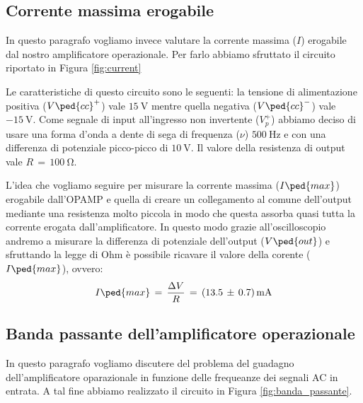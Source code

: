 \subsection*{Corrente massima erogabile}

In questo paragrafo vogliamo invece valutare la corrente massima ($I$) erogabile dal nostro amplificatore operazionale. Per farlo abbiamo sfruttato il circuito riportato in Figura \ref{fig:current}

Le caratteristiche di questo circuito sono le seguenti: la tensione di alimentazione positiva ($V\ped{cc}^+$) vale $\SI{+15}{\volt}$ mentre quella negativa ($V\ped{cc}^-$) vale $\SI{-15}{\volt}$. Come segnale di input all'ingresso non invertente ($V_p^+$) abbiamo deciso di usare una forma d'onda a dente di sega di frequenza ($\nu$) $\SI{500}{\hertz}$ e con una differenza di potenziale picco-picco di $\SI{10}{\volt}$. Il valore della resistenza di output vale $R\,=\,\SI{100}{\ohm}$.

L'idea che vogliamo seguire per misurare la corrente massima ($I\ped{max}$) erogabile dall'OPAMP e quella di creare un collegamento al comune dell'output mediante una resistenza molto piccola in modo che questa assorba quasi tutta la corrente erogata dall'amplificatore. In questo modo grazie all'oscilloscopio andremo a misurare la differenza di potenziale dell'output ($V\ped{out}$) e sfruttando la legge di Ohm è possibile ricavare il valore della corente ($I\ped{max}$), ovvero:
\begin{equation}
	I\ped{max}\,=\,\frac{\Delta V}{R}\,=\,(13.5\,\pm\,0.7)\,\SI{}{\milli\ampere}
\end{equation}

\subsection*{Banda passante dell'amplificatore operazionale}

In questo paragrafo vogliamo discutere del problema del guadagno dell'amplificatore oparazionale in funzione delle frequeanze dei segnali AC in entrata. A tal fine abbiamo realizzato il circuito in Figura \ref{fig:banda_passante}.


